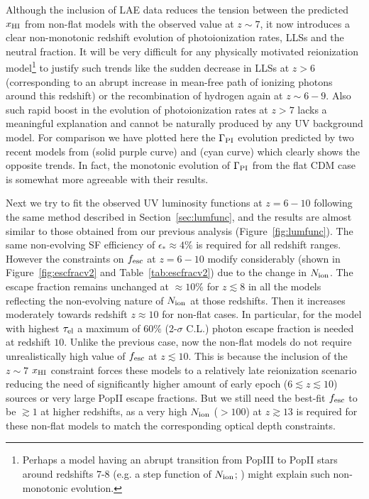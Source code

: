 \documentclass[useAMS,usenatbib]{mnras}
\begin{document}
Although the inclusion of LAE data reduces the tension between the predicted $x_{\rm HI}$
from non-flat models with the observed value at $z\sim7$, it now introduces a clear non-monotonic
redshift evolution of photoionization rates, LLSs and the neutral fraction. It will be very
difficult for any physically motivated reionization model\footnote{Perhaps a model having
an abrupt transition from PopIII to PopII stars around redshifts 7-8 (e.g. a step function of $N_{\rm ion}$;
\citealt{mitra1}) might explain such non-monotonic evolution.} to justify such trends like the sudden
decrease in LLSs at $z>6$ (corresponding to an abrupt increase in mean-free path of ionizing photons
around this redshift)
or the recombination of hydrogen again at $z\sim6-9$. Also such rapid boost in the evolution of
photoionization rates at $z>7$ lacks a meaningful explanation and cannot be naturally produced
by any UV background model. For comparison we have plotted here the $\Gamma_{\rm PI}$ evolution
predicted by two recent models from \cite{2018arXiv180109693K} (solid purple curve) and
\cite{2018arXiv180104931P} (cyan curve) which clearly shows the opposite trends. In fact,
the monotonic evolution of $\Gamma_{\rm PI}$ from the flat CDM case is somewhat more agreeable
with their results.

Next we try to fit the observed UV luminosity functions at $z=6-10$ following the same method described in
Section~\ref{sec:lumfunc}, and the results are almost similar to those obtained from our previous
analysis (Figure~\ref{fig:lumfunc}). The same non-evolving SF efficiency of $\epsilon_*\approx4\%$
is required for all redshift ranges. However the constraints on $f_{\rm esc}$ at $z=6-10$ modify considerably
(shown in Figure~\ref{fig:escfracv2} and Table~\ref{tab:escfracv2}) due to the change in
$N_{\rm ion}$. The escape fraction remains unchanged at $\approx10\%$ for $z\lesssim8$ in all the
models reflecting the non-evolving nature of $N_{\rm ion}$ at those redshifts. Then it increases
moderately towards redshift $z\approx10$ for non-flat cases. In particular, for the model with highest
$\tau_{\rm el}$ a maximum of $60\%$ (2-$\sigma$ C.L.) photon escape fraction is needed at
redshift $10$. Unlike the previous case, now the non-flat models do not require unrealistically
high value of $f_{\rm esc}$ at $z\lesssim10$. This is because the inclusion of the $z\sim7$ $x_{\rm HI}$
constraint forces these models to a relatively late
reionization scenario reducing the need of significantly higher amount of early epoch
($6\lesssim z\lesssim10$) sources or very large PopII escape fractions. But we still need
the best-fit $f_{\rm esc}$ to be $\gtrsim1$ at higher redshifts, as a very high $N_{\rm ion}$
($>100$) at $z\gtrsim13$ is required for these non-flat models to match the corresponding optical
depth constraints.
\end{document}
